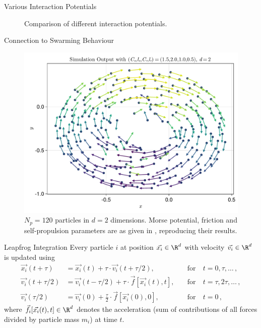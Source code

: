 \documentclass[aspectratio=169, hyperref={colorlinks=true}]{beamer}
\begin{document}
  \begin{frame}{Various Interaction Potentials}
    \begin{figure}[H]
      \centering
      \caption[Comparing potentials]{Comparison of different interaction potentials.}
      \label{fig:comparing-potentials}
    \end{figure}
  \end{frame}

  \begin{frame}{Connection to Swarming Behaviour}
    \begin{figure}[H]
      \centering
      \includegraphics[width=0.56\linewidth]{results/morse-2d/simulation-quiver.pdf}
      \caption[Quiver plot of 120 particles in 2D interacting through the Morse potential]{$N_p = 120$ particles in $d = 2$ dimensions. Morse potential, friction and self-propulsion parameters are as given in \cite{2006-self-propelled}, reproducing their results.}
      \label{fig:simulation-quiver-illustration}
    \end{figure}
  \end{frame}

  \begin{frame}{Leapfrog Integration}
    Every particle $i$ at position $\vec{x_i} \in \R^d$ with velocity $\vec{v_i} \in \R^d$ is updated using
    \begin{align*}
      \vec{x_i}(t+\tau)     & = \vec{x_i}(t)+\tau \cdot \vec{v_i}(t+\tau / 2),              & \quad\text{for}~ & t=0, \tau, \ldots\,,      \\
      \vec{v_i}(t+\tau / 2) & = \vec{v_i}(t-\tau/2) + \tau \cdot \vec{f}[\vec{x_i}(t), t],  & \quad\text{for}~ & t=\tau, 2 \tau, \ldots\,, \\
      \vec{v_i}(\tau / 2)   & = \vec{v_i}(0)+\frac{\tau}{2} \cdot \vec{f}[\vec{x_i}(0), 0], & \quad\text{for}~ & t=0\,,
    \end{align*}
    where $\vec{f_i}[\vec{x_i}(t), t] \in \R^d$ denotes the acceleration (sum of contributions of all forces divided by particle mass $m_i$) at time $t$.
  \end{frame}
\end{document}
